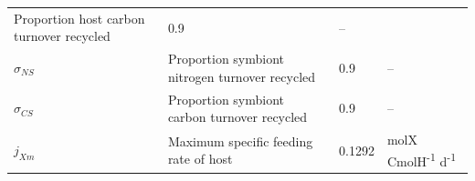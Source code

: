 \documentclass[]{elsarticle} %
\begin{document}
\begin{longtable}[c]{@{}llll@{}}
\begin{minipage}[t]{0.48\columnwidth}
Proportion host carbon turnover recycled
\strut\end{minipage} &
\begin{minipage}[t]{0.09\columnwidth}\raggedright\strut
0.9
\strut\end{minipage} &
\begin{minipage}[t]{0.23\columnwidth}\raggedright\strut
--
\strut\end{minipage}\tabularnewline
\begin{minipage}[t]{0.10\columnwidth}\raggedright\strut
\(\sigma_{NS}\)
\strut\end{minipage} &
\begin{minipage}[t]{0.48\columnwidth}\raggedright\strut
Proportion symbiont nitrogen turnover recycled
\strut\end{minipage} &
\begin{minipage}[t]{0.09\columnwidth}\raggedright\strut
0.9
\strut\end{minipage} &
\begin{minipage}[t]{0.23\columnwidth}\raggedright\strut
--
\strut\end{minipage}\tabularnewline
\begin{minipage}[t]{0.10\columnwidth}\raggedright\strut
\(\sigma_{CS}\)
\strut\end{minipage} &
\begin{minipage}[t]{0.48\columnwidth}\raggedright\strut
Proportion symbiont carbon turnover recycled
\strut\end{minipage} &
\begin{minipage}[t]{0.09\columnwidth}\raggedright\strut
0.9
\strut\end{minipage} &
\begin{minipage}[t]{0.23\columnwidth}\raggedright\strut
--
\strut\end{minipage}\tabularnewline
\begin{minipage}[t]{0.10\columnwidth}\raggedright\strut
\(j_{Xm}\)
\strut\end{minipage} &
\begin{minipage}[t]{0.48\columnwidth}\raggedright\strut
Maximum specific feeding rate of host
\strut\end{minipage} &
\begin{minipage}[t]{0.09\columnwidth}\raggedright\strut
0.1292
\strut\end{minipage} &
\begin{minipage}[t]{0.23\columnwidth}\raggedright\strut
molX CmolH\textsuperscript{-1} d\textsuperscript{-1}
\strut\end{minipage}\tabularnewline

\end{longtable}
\end{document}
